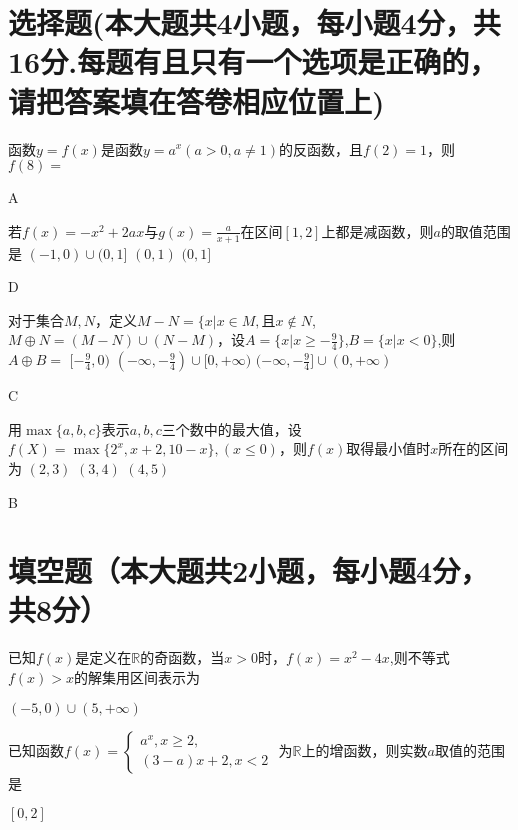 \begin{exercise}
\section{选择题(本大题共4小题，每小题4分，共16分.每题有且只有一个选项是正确的，请把答案填在答卷相应位置上)}
\item
函数$y=f(x)$是函数$y=a^x(a>0,a\neq1)$的反函数，且$f(2)=1$，则$f(8)=$\xz
\begin{answer}
  A
\end{answer}
\item
若$f(x)=-x^2+2ax$与$g(x)=\frac{a}{x+1}$在区间$[1,2]$上都是减函数，则$a$的取值范围是\xz
  {$(-1,0)\cup (0,1]$}
  {$(0,1)$}
  {$(0,1]$}
\begin{answer}
  D
\end{answer}
\item
对于集合$M,N$，定义$M-N=\{x|x\in M,\text{且}x\notin N$,$M\oplus N=(M-N)\cup(N-M)$，设$A=\{x|x\geq-\frac{9}4\}$,$B=\{x|x<0\}$,则$A\oplus B=$\xz
  \xx{$(-\frac{9}4,0]$}
  {$[-\frac{9}4,0)$}
  {$(-\infty,-\frac{9}4)\cup[0,+\infty)$}
  {$(-\infty,-\frac{9}4]\cup(0,+\infty)$}
\begin{answer}
  C
\end{answer}
\item
用$\max\{a,b,c\}$表示$a,b,c$三个数中的最大值，设$f(X)=\max\{2^x,x+2,10-x\},(x\leq 0)$，则$f(x)$取得最小值时$x$所在的区间为\xz
  {$(2,3)$}
  {$(3,4)$}
  {$(4,5)$}
\begin{answer}
  B
\end{answer}
\section{填空题（本大题共2小题，每小题4分，共8分）}
\item
已知$f(x)$是定义在$\mathbb{R}$的奇函数，当$x>0$时，$f(x)=x^2-4x$,则不等式$f(x)>x$的解集用区间表示为\tk
\begin{answer}
  $(-5,0)\cup(5,+\infty)$
\end{answer}
\item
已知函数$f(x)=\begin{cases}
  a^x,x\geq 2,\\(3-a)x+2,x<2
\end{cases}$
为$\mathbb{R}$上的增函数，则实数$a$取值的范围是\tk
\begin{answer}
  $[0,2]$
\end{answer}

\end{exercise}
